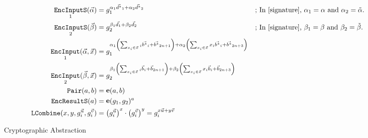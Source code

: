 \documentclass[pdftex,12pt,a4papaer,twoside,notitlepage]{report}
\DeclareMathOperator{\e}{\mathbf{e}}
\DeclareMathOperator{\ein}{\mathtt{EncInput}}
\DeclareMathOperator{\combine}{\mathtt{LCombine}}
\DeclareMathOperator{\eins}{\mathtt{EncInputS}}
\DeclareMathOperator{\eouts}{\mathtt{EncResultS}}
\DeclareMathOperator{\pair}{\mathtt{Pair}}
\begin{document}
\begin{figure}[H]
\label{fig:abstraction}
\begin{align*}
  \eins_1(\Ap) &= g_1^{\alpha_1\vec{d^*}_1 + \alpha_2\vec{d^*}_2} && \text{; In \cite{signature}, $\alpha_1 = \alpha$ and $\alpha_2 = \tilde{\alpha}$.} \\
  \eins_2(\Bp) &= g_2^{\beta_1\vec{d}_1 + \beta_2\vec{d}_2} && \text{; In \cite{signature}, $\beta_1 = \beta$ and $\beta_2 = \tilde{\beta}$.} \\
  \ein_1(\Ap, \vec{x}) &= g_1^{\alpha_1\left(\sum_{x_i \in \vec{x}}{_i\vec{b^*}_i} + \vec{b^*}_{2n+1}\right) + \alpha_2\left(\sum_{x_i \in \vec{x}}{x_i\vec{b^*}_i} + \vec{b^*}_{2n+3}\right)} \\
  \ein_2(\Bp, \vec{x}) &= g_2^{\beta_1\left(\sum_{x_i \in \vec{x}}{_i\vec{b}_i} + \vec{b}_{2n+1}\right) + \beta_2\left(\sum_{x_i \in \vec{x}}{x_i\vec{b}_i} + \vec{b}_{2n+3}\right)} \\
  \pair(a, b) &= \e(a, b) \\
  \eouts(a) &= \e(g_1, g_2)^a \\
  \combine(x, y, g_i^{\vec{u}}, g_i^{\vec{v}}) &= \left(g_i^{\vec{u}}\right)^x \cdot \left(g_i^{\vec{v}}\right)^y = g_i^{x\vec{u} + y\vec{v}}
\end{align*}
\caption{Cryptographic Abstraction}
\end{figure}
\end{document}
